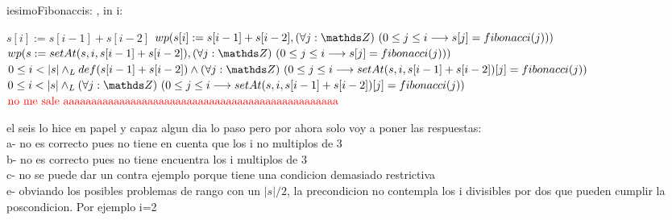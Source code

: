 \documentclass[10pt,a4paper]{article}
\begin{document}
\begin{proc}{\color{red}iesimoFibonacci}{\Inout s: \TLista{\ent}, in i: \ent}{}
\end{proc}
\begin{algorithm*}
    $s[i]:=s[i-1]+s[i-2]$
    \BlankLine
    $wp(s[i]:=s[i-1]+s[i-2], \paraTodo[unalinea]{j}{\ent}{0\leq j \leq i \implica s[j]=fibonacci(j)})$
    $wp(s:=setAt(s,i,s[i-1]+s[i-2]), \paraTodo[unalinea]{j}{\ent}{0\leq j \leq i \implica s[j]=fibonacci(j)})$
    $0\leq i < |s| \yLuego def(s[i-1]+s[i-2]) \land \paraTodo[unalinea]{j}{\ent}{0\leq j \leq i \implica setAt(s,i,s[i-1]+s[i-2])[j]=fibonacci(j)}$
    $0\leq i < |s| \yLuego \paraTodo[unalinea]{j}{\ent}{0\leq j \leq i \implica setAt(s,i,s[i-1]+s[i-2])[j]=fibonacci(j)}$
    $\text{\color{red}no me sale aaaaaaaaaaaaaaaaaaaaaaaaaaaaaaaaaaaaaaaaaaaaaaaaa}$
\end{algorithm*}

el seis lo hice en papel y capaz algun dia lo paso pero por ahora solo voy a poner las respuestas:\\
a- no es correcto pues no tiene en cuenta que los i no multiplos de 3\\
b- no es correcto pues no tiene encuentra los i multiplos de 3\\
c- no se puede dar un contra ejemplo porque tiene una condicion demasiado restrictiva\\
e- obviando los posibles problemas de rango con un $|s|/2$, la precondicion no contempla los i divisibles por dos que pueden cumplir la poscondicion. Por ejemplo i=2
\end{document}
